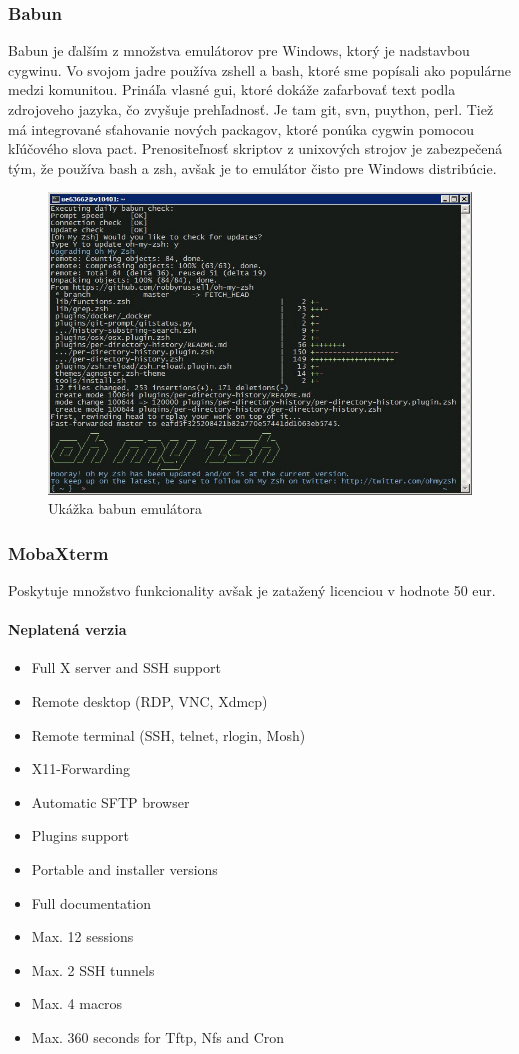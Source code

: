 \subsubsection{Babun}
\indent Babun je ďalším z množstva emulátorov pre Windows, ktorý je nadstavbou cygwinu. Vo svojom jadre používa zshell a bash, ktoré sme popísali ako populárne medzi komunitou. Prináľa vlasné gui, ktoré dokáže zafarbovať text podla zdrojoveho jazyka, čo zvyšuje prehľadnosť. Je tam git, svn, puython, perl. Tiež má integrované sťahovanie nových packagov, ktoré ponúka cygwin pomocou kľúčového slova pact. Prenositeľnosť skriptov z unixových strojov je zabezpečená tým, že používa bash a zsh, avšak je to emulátor čisto pre Windows distribúcie.
\begin{figure}[!htbp]
	\centering
	\includegraphics[width=15cm]{img/babun.jpeg}
	\caption{Ukážka babun emulátora}
	\label{fig:test}
\end{figure}
\subsubsection{MobaXterm}
\indent Poskytuje množstvo funkcionality avšak je zatažený licenciou v hodnote 50 eur. 
\paragraph{Neplatená verzia}
\begin{itemize}
	\item Full X server and SSH support
	\item Remote desktop (RDP, VNC, Xdmcp)
	\item Remote terminal (SSH, telnet, rlogin, Mosh)
	\item X11-Forwarding
	\item Automatic SFTP browser
	\item Plugins support
	\item Portable and installer versions
	\item Full documentation
	\item Max. 12 sessions
	\item Max. 2 SSH tunnels
	\item Max. 4 macros
	\item Max. 360 seconds for Tftp, Nfs and Cron
\end{itemize}

